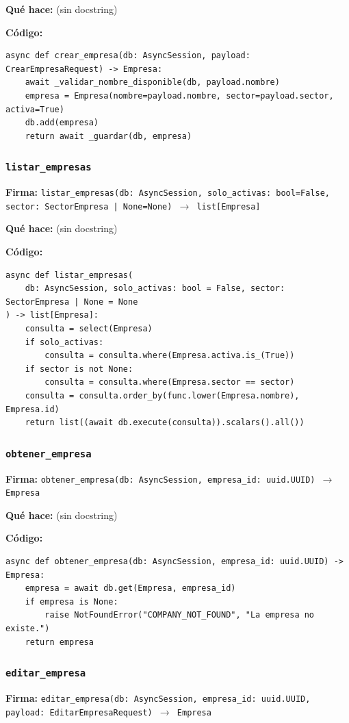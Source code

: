 \documentclass[11pt,a4paper]{article}
\begin{document}
\textbf{Qué hace:} (sin docstring)

\textbf{Código:}
\begin{lstlisting}
async def crear_empresa(db: AsyncSession, payload: CrearEmpresaRequest) -> Empresa:
    await _validar_nombre_disponible(db, payload.nombre)
    empresa = Empresa(nombre=payload.nombre, sector=payload.sector, activa=True)
    db.add(empresa)
    return await _guardar(db, empresa)
\end{lstlisting}

\subsubsection*{\texttt{listar\_empresas}}
\textbf{Firma:} \texttt{listar\_empresas(db: AsyncSession, solo\_activas: bool=False, sector: SectorEmpresa | None=None) $\rightarrow$ list[Empresa]}

\textbf{Qué hace:} (sin docstring)

\textbf{Código:}
\begin{lstlisting}
async def listar_empresas(
    db: AsyncSession, solo_activas: bool = False, sector: SectorEmpresa | None = None
) -> list[Empresa]:
    consulta = select(Empresa)
    if solo_activas:
        consulta = consulta.where(Empresa.activa.is_(True))
    if sector is not None:
        consulta = consulta.where(Empresa.sector == sector)
    consulta = consulta.order_by(func.lower(Empresa.nombre), Empresa.id)
    return list((await db.execute(consulta)).scalars().all())
\end{lstlisting}

\subsubsection*{\texttt{obtener\_empresa}}
\textbf{Firma:} \texttt{obtener\_empresa(db: AsyncSession, empresa\_id: uuid.UUID) $\rightarrow$ Empresa}

\textbf{Qué hace:} (sin docstring)

\textbf{Código:}
\begin{lstlisting}
async def obtener_empresa(db: AsyncSession, empresa_id: uuid.UUID) -> Empresa:
    empresa = await db.get(Empresa, empresa_id)
    if empresa is None:
        raise NotFoundError("COMPANY_NOT_FOUND", "La empresa no existe.")
    return empresa
\end{lstlisting}

\subsubsection*{\texttt{editar\_empresa}}
\textbf{Firma:} \texttt{editar\_empresa(db: AsyncSession, empresa\_id: uuid.UUID, payload: EditarEmpresaRequest) $\rightarrow$ Empresa}
\end{document}

